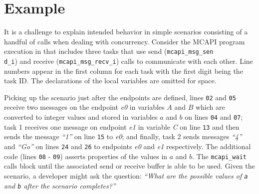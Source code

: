 \section{Example}

It is a challenge to explain intended behavior in simple scenarios
consisting of a handful of calls when dealing with concurrency. Consider
the MCAPI program execution in  that includes three
tasks that use send (\texttt{mcapi\_msg\_sen\\d\_i}) and receive
(\texttt{mcapi\_msg\_recv\_i}) calls to communicate with each other.
Line numbers appear in the first column for each task with the first digit being the task ID. The
declarations of the local variables are omitted for space. 

Picking up
the scenario just after the endpoints are defined, lines \texttt{02}
and \texttt{05} receive two messages on the endpoint
\textit{e0} in variables $A$ and $B$ which are
converted to integer values and stored in variables $a$ and
$b$ on lines \texttt{04} and \texttt{07}; task 1 receives one
message on endpoint \textit{e1} in variable \textit{C} on line
\texttt{13} and then sends the message \textit{``1''} on line \texttt{15} to
\textit{e0}; and finally, task 2 sends messages \textit{``4''} and \textit{``Go''} on
lines \texttt{24} and \texttt{26} to endpoints \textit{e0} and
\textit{e1} respectively. The additional code (lines \texttt{08} -
\texttt{09}) asserts properties of the values in $a$ and
$b$. The \texttt{mcapi\_wait} calls block until the associated
send or receive buffer is able to be used. Given the scenario, a developer
might ask the question: \emph{``What are the possible values of
\texttt{a} and \texttt{b} after the scenario completes?''}

